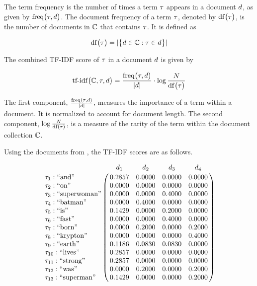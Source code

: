 		\begin{defn}
			The term frequency is the number of times a term $\tau$ appears in a document $d$, as given by $\operatorname{freq}\bigl(\tau, d\bigr)$.	The document frequency of a term $\tau$, denoted by $\operatorname{df}\bigl(\tau\bigr)$, is the number of documents in $\mathbb{C}$ that contains $\tau$.	 It is defined as
			
			\[
				\operatorname{df}\bigl(\tau\bigr) = \lvert\bigl\{d \in \mathbb{C}: \tau \in d\bigr\}\rvert
			\]
			
			The combined TF-IDF score of $\tau$ in a document $d$ is given by
			
			\[
				\operatorname{tf-idf}\bigl(\mathbb{C}, \tau, d\bigr) = \frac{\operatorname{freq}\bigl(\tau, d\bigr)}{\lvert d\rvert} \cdot \log{\frac{N}{\operatorname{df}\bigl(\ensuremath \tau\bigr)}}
			\]
		\end{defn}
		
		\begin{remark}
			The first component, $\frac{\operatorname{freq}\left(\tau, d\right)}{\lvert d\rvert}$, measures the importance of a term within a document.  It is normalized to account for document length.	 The second component, $\log{\frac{N}{\operatorname{df}\left(\ensuremath \tau\right)}}$, is a measure of the rarity of the term within the document collection $\mathbb{C}$.
		\end{remark}
		
		\begin{ex}
			Using the documents from , the TF-IDF scores are as follows.
			
			\[
				\bordermatrix{
					~ & \doc_1 & \doc_2 & \doc_3 & \doc_4 \cr
					\term_1 : \textrm{``and''} & 0.2857 & 0.0000 & 0.0000 & 0.0000 \cr
					\term_2 : \textrm{``on''} & 0.0000 & 0.0000 & 0.0000 & 0.0000 \cr
					\term_3 : \textrm{``superwoman''} & 0.0000 & 0.0000 & 0.4000 & 0.0000 \cr
					\term_4 : \textrm{``batman''} & 0.0000 & 0.4000 & 0.0000 & 0.0000 \cr
					\term_5 : \textrm{``is''} & 0.1429 & 0.0000 & 0.2000 & 0.0000 \cr
					\term_6 : \textrm{``fast''} & 0.0000 & 0.0000 & 0.4000 & 0.0000 \cr
					\term_7 : \textrm{``born''} & 0.0000 & 0.2000 & 0.0000 & 0.2000 \cr
					\term_8 : \textrm{``krypton''} & 0.0000 & 0.0000 & 0.0000 & 0.4000 \cr
					\term_9 : \textrm{``earth''} & 0.1186 & 0.0830 & 0.0830 & 0.0000 \cr
					\term_{10} : \textrm{``lives''} & 0.2857 & 0.0000 & 0.0000 & 0.0000 \cr
					\term_{11} : \textrm{``strong''} & 0.2857 & 0.0000 & 0.0000 & 0.0000 \cr
					\term_{12} : \textrm{``was''} & 0.0000 & 0.2000 & 0.0000 & 0.2000 \cr
					\term_{13} : \textrm{``superman''} & 0.1429 & 0.0000 & 0.0000 & 0.2000 \cr
				}
			\]
		\end{ex}

